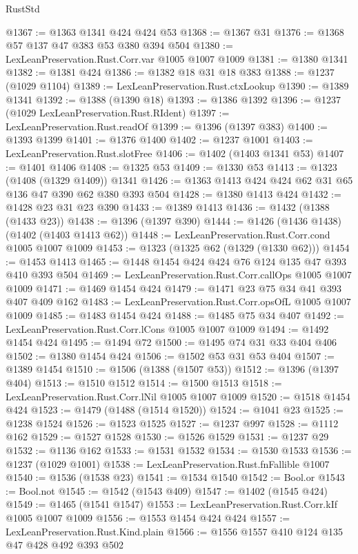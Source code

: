 \begin{lexlean}{RustStd}
\begin{coremodule}
@1367 := @1363 @1341 @424 @424 @53
@1368 := @1367 @31
@1376 := @1368 @57 @137 @47 @383 @53 @380 @394 @504
@1380 := LexLeanPreservation.Rust.Corr.var @1005 @1007 @1009
@1381 := @1380 @1341
@1382 := @1381 @424
@1386 := @1382 @18 @31 @18 @383
@1388 := @1237 (@1029 @1104)
@1389 := LexLeanPreservation.Rust.ctxLookup
@1390 := @1389 @1341
@1392 := @1388 (@1390 @18)
@1393 := @1386 @1392
@1396 := @1237 (@1029 LexLeanPreservation.Rust.RIdent)
@1397 := LexLeanPreservation.Rust.readOf
@1399 := @1396 (@1397 @383)
@1400 := @1393 @1399
@1401 := @1376 @1400
@1402 := @1237 @1001
@1403 := LexLeanPreservation.Rust.slotFree
@1406 := @1402 (@1403 @1341 @53)
@1407 := @1401 @1406
@1408 := @1325 @53
@1409 := @1330 @53
@1413 := @1323 (@1408 (@1329 @1409)) @1341
@1426 := @1363 @1413 @424 @424 @62 @31 @65 @136 @47 @390 @62 @380 @393 @504
@1428 := @1380 @1413 @424
@1432 := @1428 @23 @31 @23 @390
@1433 := @1389 @1413
@1436 := @1432 (@1388 (@1433 @23))
@1438 := @1396 (@1397 @390)
@1444 := @1426 (@1436 @1438) (@1402 (@1403 @1413 @62))
@1448 := LexLeanPreservation.Rust.Corr.cond @1005 @1007 @1009
@1453 := @1323 (@1325 @62 (@1329 (@1330 @62)))
@1454 := @1453 @1413
@1465 := @1448 @1454 @424 @424 @76 @124 @135 @47 @393 @410 @393 @504
@1469 := LexLeanPreservation.Rust.Corr.callOps @1005 @1007 @1009
@1471 := @1469 @1454 @424
@1479 := @1471 @23 @75 @34 @41 @393 @407 @409 @162
@1483 := LexLeanPreservation.Rust.Corr.opsOfL @1005 @1007 @1009
@1485 := @1483 @1454 @424
@1488 := @1485 @75 @34 @407
@1492 := LexLeanPreservation.Rust.Corr.lCons @1005 @1007 @1009
@1494 := @1492 @1454 @424
@1495 := @1494 @72
@1500 := @1495 @74 @31 @33 @404 @406
@1502 := @1380 @1454 @424
@1506 := @1502 @53 @31 @53 @404
@1507 := @1389 @1454
@1510 := @1506 (@1388 (@1507 @53))
@1512 := @1396 (@1397 @404)
@1513 := @1510 @1512
@1514 := @1500 @1513
@1518 := LexLeanPreservation.Rust.Corr.lNil @1005 @1007 @1009
@1520 := @1518 @1454 @424
@1523 := @1479 (@1488 (@1514 @1520))
@1524 := @1041 @23
@1525 := @1238 @1524
@1526 := @1523 @1525
@1527 := @1237 @997
@1528 := @1112 @162
@1529 := @1527 @1528
@1530 := @1526 @1529
@1531 := @1237 @29
@1532 := @1136 @162
@1533 := @1531 @1532
@1534 := @1530 @1533
@1536 := @1237 (@1029 @1001)
@1538 := LexLeanPreservation.Rust.fnFallible @1007
@1540 := @1536 (@1538 @23)
@1541 := @1534 @1540
@1542 := Bool.or
@1543 := Bool.not
@1545 := @1542 (@1543 @409)
@1547 := @1402 (@1545 @424)
@1549 := @1465 (@1541 @1547)
@1553 := LexLeanPreservation.Rust.Corr.kIf @1005 @1007 @1009
@1556 := @1553 @1454 @424 @424
@1557 := LexLeanPreservation.Rust.Kind.plain
@1566 := @1556 @1557 @410 @124 @135 @47 @428 @492 @393 @502

\end{coremodule}
\end{lexlean}
